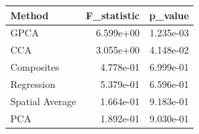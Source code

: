 \begin{tabular}{lrr}
\toprule
Method & F_statistic & p_value \\
\midrule
GPCA & 6.599e+00 & 1.235e-03 \\
CCA & 3.055e+00 & 4.148e-02 \\
Composites & 4.778e-01 & 6.999e-01 \\
Regression & 5.379e-01 & 6.596e-01 \\
Spatial Average & 1.664e-01 & 9.183e-01 \\
PCA & 1.892e-01 & 9.030e-01 \\
\bottomrule
\end{tabular}
